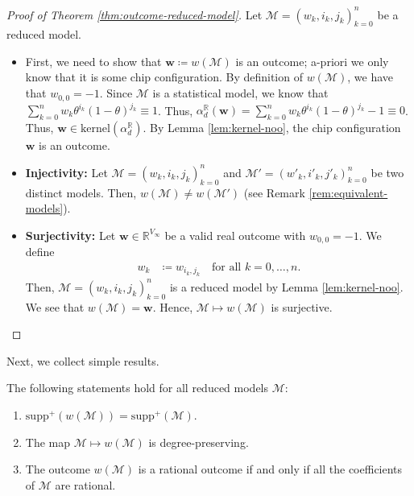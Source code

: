 \begin{proof}[Proof of Theorem \ref{thm:outcome-reduced-model}]
    Let \( \mathcal{M} = (w_k,i_k,j_k)_{k=0}^n \) be a reduced model. 

    \begin{itemize}
        \item First, we need to show that \( \mathbf w \coloneqq w(\mathcal{M}) \) is an outcome; a-priori we only know that it is some chip configuration. By definition of \( w(\mathcal{M}) \), we have that \( w_{0,0} = -1 \). Since \( \mathcal{M} \) is a statistical model, we know that \( \sum_{k=0}^n w_k \theta^{i_k} (1-\theta)^{j_k} \equiv 1 \). Thus, \( \alpha_d^{\mathbb R}(\mathbf w) = \sum_{k=0}^n w_k \theta^{i_k} (1-\theta)^{j_k} -1 \equiv 0 \). Thus, \( \mathbf{w} \in \mathrm{kernel}(\alpha_d^{\mathbb R}) \). By Lemma \ref{lem:kernel-noo}, the chip configuration \( \mathbf w \) is an outcome.
        
        \item \textbf{Injectivity:} Let \( \mathcal{M} = (w_k,i_k,j_k)^n_{k=0} \) and \( \mathcal{M}' = (w'_k,i'_k,j'_k)^n_{k=0} \) be two distinct models. Then, \( w(\mathcal{M}) \neq w(\mathcal{M}') \) (see Remark \ref{rem:equivalent-models}). 
        
        \item \textbf{Surjectivity:} Let \( \mathbf w \in \mathbb{R}^{V_\infty} \) be a valid real outcome with \( w_{0,0} = -1 \). We define 
        \begin{align*}
            w_k &\coloneqq w_{i_k,j_k} \quad \text{for all } k = 0, \dots, n.
        \end{align*}
        Then, \( \mathcal{M}= (w_k,i_k,j_k)^n_{k=0} \) is a reduced model by Lemma \ref{lem:kernel-noo}. We see that \( w(\mathcal{M}) = \mathbf w \). Hence, \( \mathcal{M} \mapsto w(\mathcal{M}) \) is surjective.
    \end{itemize}
\end{proof}

Next, we collect simple results.

\begin{proposition}
    The following statements hold for all reduced models \( \mathcal{M} \):
    \begin{enumerate}
        \item \( \mathrm{supp}^+(w(\mathcal{M})) = \mathrm{supp}^+(\mathcal{M})\).
        \item The map \( \mathcal{M} \mapsto w(\mathcal{M}) \) is degree-preserving.
        \item The outcome \( w(\mathcal{M}) \) is a rational outcome if and only if all the coefficients of \( \mathcal{M} \) are rational.
    \end{enumerate}
\end{proposition}

